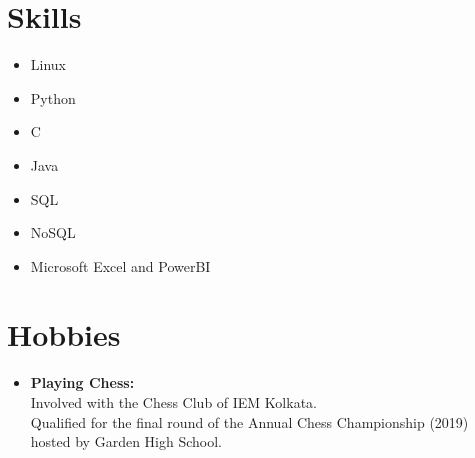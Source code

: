 \documentclass[a4paper,10pt]{article}
\begin{document}
\section*{Skills}
\begin{itemize}[leftmargin=*]
    \item Linux
    \item Python
    \item C
    \item Java
    \item SQL
    \item NoSQL
    \item Microsoft Excel and PowerBI
\end{itemize}

\section*{Hobbies}
\begin{itemize}[leftmargin=*]
    \item \textbf{Playing Chess:} \vspace{0.2cm} \\
    Involved with the Chess Club of IEM Kolkata. \\
    Qualified for the final round of the Annual Chess Championship (2019) hosted by Garden High School.
\end{itemize}
\end{document}
